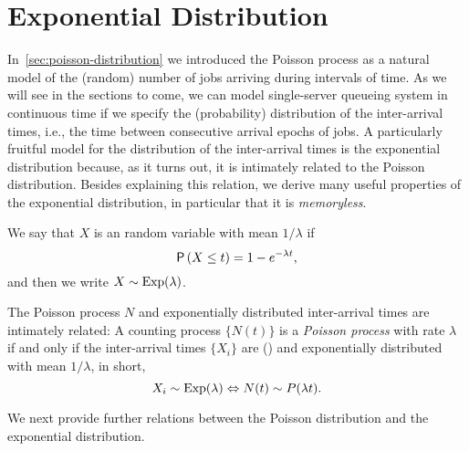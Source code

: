 \section{Exponential Distribution}
\label{sec:expon-distr}




In~\cref{sec:poisson-distribution} we introduced the Poisson process as a natural model of the (random) number of jobs arriving during intervals of time.
As we will see in the sections to come, we can model single-server queueing system in continuous time if we specify the (probability) distribution of the inter-arrival times, i.e., the time between consecutive arrival epochs of jobs.
A particularly fruitful model for the distribution of the inter-arrival times is the exponential distribution because, as it turns out, it is intimately related to the Poisson distribution.
Besides explaining this relation, we derive many useful properties of the exponential distribution, in particular that it is \emph{memoryless}.

We say that $X$ is an  random variable with mean $1/\lambda$ if 
\begin{equation*}
  \P{X \leq t} = 1- e^{-\lambda t},
\end{equation*}
and then  we write $X\sim \operatorname{Exp}(\lambda)$.


The Poisson process $N$ and exponentially distributed inter-arrival times are intimately related: A counting process $\{N(t)\}$ is a \emph{Poisson process} with rate $\lambda$ if and only if  the inter-arrival times $\{X_i\}$ are  () and exponentially distributed with mean $1/\lambda$,  in short, 
\begin{equation*}
X_i\sim \operatorname{Exp}(\lambda) \Leftrightarrow N(t) \sim P(\lambda t).
\end{equation*}


We next provide further relations between the Poisson distribution and the exponential distribution. 


